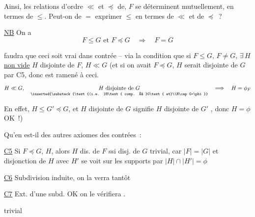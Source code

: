 
Ainsi, les relations d'ordre $\ll$ et $\preceq$ de, $F$ se déterminent mutuellement, en termes de $\leq$. Peut-on de $=$ exprimer $\leq$ en termes de $\ll$ et de $\preceq$~?

\uline{NB} On a
\[
 F\leq G\text{ et }F\preceq G\quad\Longrightarrow\quad F=G
\]

 faudra que ceci soit vrai dans  contrée -- via la condition que si $F\leq G$, $F\ne G$, $\exists\,H$  \uline{non vide} $H$ disjointe de $F$, $H\ll G$ (et si on avait $F\preceq G$, $H$ serait disjointe de $G$ par C5, donc  est ramené à ceci. 
\[
 H\ll G,\quad
 \underset{\inserted{\substack{\text{(i.e. }H\text{ comp. à }G\text{ et}\\H\cap G=\phi}}}{H\text{ disjointe de }G}
 \quad\Longrightarrow\quad H=\phi_{F}
\]

En effet, $H\leq G'\preceq G$,  et $H$ disjointe de $G$ signifie $H$ disjointe de $G'$ , donc $H=\phi$ OK~!)


Qu'en est-il des autres axiomes des contrées~:

\uline{C5} Si $F\preceq G$, $H$, alors $H$ dis. de $F$ ssi disj. de $G$ trivial, car $|F|=|G|$ et disjonction de $H$ avec $H'$ se voit sur les supports par $|H|\cap|H'|=\phi$

\uline{C6} Subdivision induite, on la verra tantôt

\uline{C7} Ext. d'une subd. OK on le vérifiera .

\uline{} trivial
